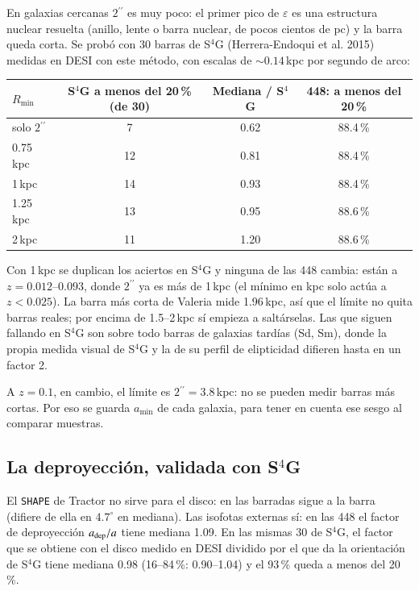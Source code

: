 \documentclass[11pt,a4paper]{article}
\newcommand{\as}{\ensuremath{^{\prime\prime}}}
\newcommand{\code}[1]{\texttt{#1}}
\begin{document}
En galaxias cercanas $2\as$ es muy poco: el primer pico de $\varepsilon$ es una estructura nuclear resuelta (anillo,
lente o barra nuclear, de pocos cientos de pc) y la barra queda corta. Se probó con 30 barras de S$^4$G
(Herrera-Endoqui et al. 2015) medidas en DESI con este método, con escalas de $\sim 0.14$\,kpc por segundo de arco:
\begin{center}
\begin{tabular}{lccc}
\toprule
$R_{\min}$ & S$^4$G a menos del 20\,\% (de 30) & Mediana / S$^4$G & 448: a menos del 20\,\% \\
\midrule
solo $2\as$ & 7 & 0.62 & 88.4\,\% \\
0.75\,kpc & 12 & 0.81 & 88.4\,\% \\
1\,kpc & 14 & 0.93 & 88.4\,\% \\
1.25\,kpc & 13 & 0.95 & 88.6\,\% \\
2\,kpc & 11 & 1.20 & 88.6\,\% \\
\bottomrule
\end{tabular}
\end{center}
Con 1\,kpc se duplican los aciertos en S$^4$G y ninguna de las 448 cambia: están a $z = 0.012$--$0.093$, donde
$2\as$ ya es más de 1\,kpc (el mínimo en kpc solo actúa a $z < 0.025$). La barra más corta de Valeria mide 1.96\,kpc,
así que el límite no quita barras reales; por encima de 1.5--2\,kpc sí empieza a saltárselas. Las que siguen
fallando en S$^4$G son sobre todo barras de galaxias tardías (Sd, Sm), donde la propia medida visual de S$^4$G y la
de su perfil de elipticidad difieren hasta en un factor 2.

A $z = 0.1$, en cambio, el límite es $2\as = 3.8$\,kpc: no se pueden medir barras más cortas. Por eso se guarda
$a_{\min}$ de cada galaxia, para tener en cuenta ese sesgo al comparar muestras.

\subsection{La deproyección, validada con S$^4$G}

El \code{SHAPE} de Tractor no sirve para el disco: en las barradas sigue a la barra (difiere de ella en
$4.7^\circ$ en mediana). Las isofotas externas sí: en las 448 el factor de deproyección
$a_{\rm dep}/a$ tiene mediana 1.09. En las mismas 30 de S$^4$G, el factor que se obtiene con el disco medido en DESI
dividido por el que da la orientación de S$^4$G tiene mediana 0.98 (16--84\,\%: 0.90--1.04) y el 93\,\% queda a
menos del 20\,\%.
\end{document}
